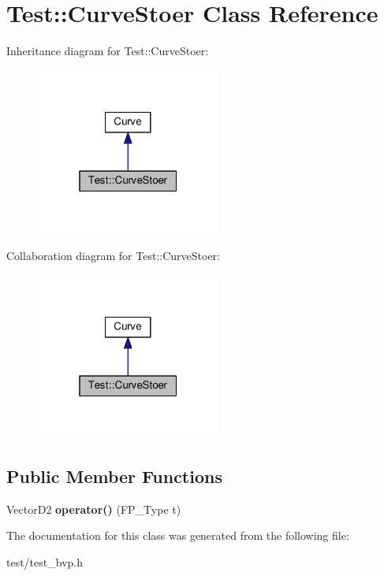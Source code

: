 \hypertarget{classTest_1_1CurveStoer}{}\section{Test\+:\+:Curve\+Stoer Class Reference}
\label{classTest_1_1CurveStoer}


Inheritance diagram for Test\+:\+:Curve\+Stoer\+:\nopagebreak
\begin{figure}[H]
\begin{center}
\leavevmode
\includegraphics[width=172pt]{classTest_1_1CurveStoer__inherit__graph}
\end{center}
\end{figure}


Collaboration diagram for Test\+:\+:Curve\+Stoer\+:\nopagebreak
\begin{figure}[H]
\begin{center}
\leavevmode
\includegraphics[width=172pt]{classTest_1_1CurveStoer__coll__graph}
\end{center}
\end{figure}
\subsection*{Public Member Functions}
\begin{DoxyCompactItemize}
\item 
\mbox{\label{classTest_1_1CurveStoer_a26d8d77360d605f266f1b2ef9ad9e824}} 
Vector\+D2 {\bfseries operator()} (F\+P\+\_\+\+Type t)
\end{DoxyCompactItemize}


The documentation for this class was generated from the following file\+:\begin{DoxyCompactItemize}
\item 
test/test\+\_\+bvp.\+h\end{DoxyCompactItemize}
